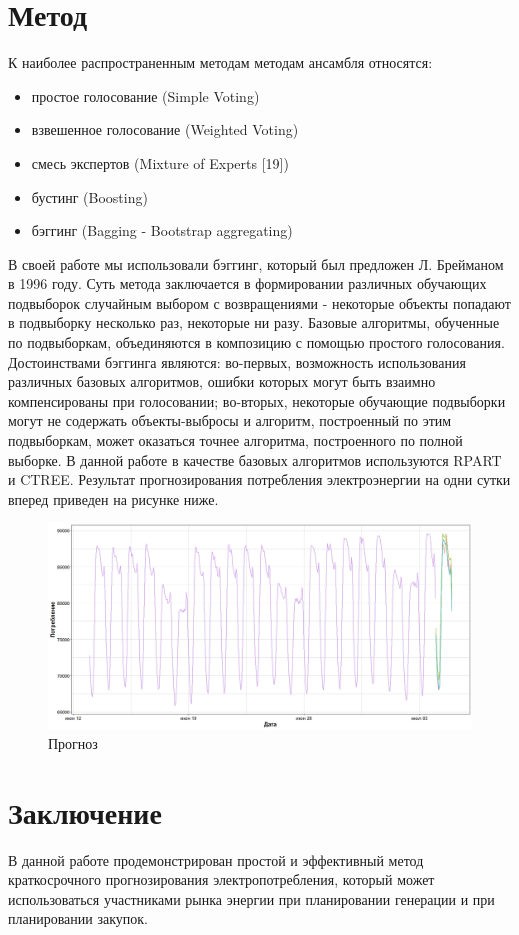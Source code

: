 \documentclass[60x84/16,8pt]{ittmm}
\begin{document}
\section{Метод}
\label{sec:methods}
К наиболее распространенным методам методам ансамбля относятся:
\begin{itemize}
    \item простое голосование (Simple Voting)
    \item взвешенное голосование (Weighted Voting)
    \item смесь экспертов (Mixture of Experts [19])
    \item бустинг (Boosting)
    \item бэггинг (Bagging - Bootstrap aggregating)
\end{itemize}
В своей работе мы использовали бэггинг, который был предложен Л. Брейманом в
1996 году. Суть метода заключается в формировании различных обучающих подвыборок
случайным выбором с возвращениями - некоторые объекты попадают в подвыборку
несколько раз, некоторые ни разу. Базовые алгоритмы, обученные по подвыборкам,
объединяются в композицию с помощью простого голосования. Достоинствами бэггинга
являются: во-первых, возможность использования различных базовых алгоритмов,
ошибки которых могут быть взаимно компенсированы при голосовании; во-вторых,
некоторые обучающие подвыборки могут не содержать объекты-выбросы и алгоритм,
построенный по этим подвыборкам, может оказаться точнее алгоритма, построенного
по полной выборке. В данной работе в качестве базовых алгоритмов используются
RPART и CTREE. Результат прогнозирования потребления электроэнергии на одни
сутки вперед приведен на рисунке ниже.
\begin{figure}
  \centering
  \includegraphics[width=0.8\linewidth]{Ru/prediction.jpeg}
  \caption{Прогноз}
  \label{fig:prediction}
\end{figure}


\section{Заключение}
В данной работе продемонстрирован простой и эффективный метод краткосрочного
прогнозирования электропотребления, который может использоваться участниками
рынка энергии при планировании генерации и при планировании закупок.
\end{document}
